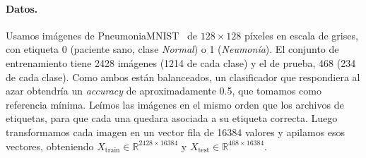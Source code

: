 \documentclass[11pt,a4paper]{article}
\newcommand{\acc}{\emph{accuracy}}
\begin{document}
\paragraph{Datos.} Usamos imágenes de PneumoniaMNIST~\cite{medmnist} de $128\times128$ píxeles en escala de
grises, con etiqueta 0 (paciente sano, clase \emph{Normal}) o 1 (\emph{Neumonía}). El conjunto de
entrenamiento tiene 2428 imágenes (1214 de cada clase) y el de prueba, 468 (234 de cada clase). Como ambos
están balanceados, un clasificador que respondiera al azar obtendría un \acc{} de aproximadamente 0.5, que
tomamos como referencia mínima. Leímos las imágenes en el mismo orden que los archivos de etiquetas, para
que cada una quedara asociada a su etiqueta correcta. Luego transformamos cada imagen en un vector fila de
16384 valores y apilamos esos vectores, obteniendo $X_{\text{train}} \in \mathbb{R}^{2428\times16384}$ y
$X_{\text{test}} \in \mathbb{R}^{468\times16384}$.
\end{document}
